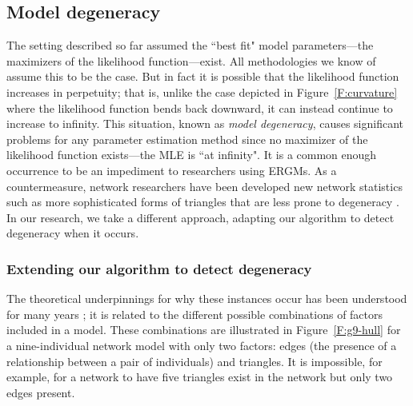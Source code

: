 \documentclass[12pt]{article}
\begin{document}
\subsection{Model degeneracy}
The setting described so far assumed the ``best fit" model parameters---the 
maximizers of the likelihood function---exist.  All methodologies we know of
assume this to be the case.
But in fact it is possible that the likelihood function increases in perpetuity;
that is, unlike the case depicted in Figure~\ref{F:curvature} where 
the likelihood function bends back downward, it can instead continue 
to increase to infinity.  This situation, known as \emph{model degeneracy}, 
causes significant problems for any parameter estimation method since 
no maximizer of the likelihood function exists---the MLE
is ``at infinity".  It is a common enough occurrence to be an impediment to 
researchers using ERGMs.
As a countermeasure, network researchers have been developed
 new network statistics such as more sophisticated forms of triangles that are 
less prone to degeneracy \citep{advancesp*,recentp*}.
In our research, we take a different approach, adapting our algorithm to detect 
 degeneracy when it occurs.

\subsubsection{Extending our algorithm to detect degeneracy}
The theoretical underpinnings for why these instances occur has been 
understood for many years \citep[Chapter 9]{Barndorff}; it is related to the 
different possible combinations of factors included in a model.
These combinations are illustrated in Figure~\ref{F:g9-hull} for a nine-individual network 
model with only two factors: edges (the presence of a relationship between a pair of individuals)
and triangles.  It is impossible, for example, for a network to have five 
triangles exist in the network but only two edges present.

\end{document}

